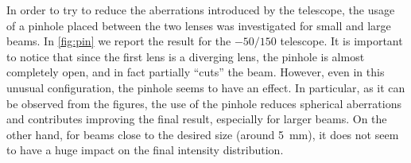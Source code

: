 In order to try to reduce the aberrations introduced by the telescope, the usage of a pinhole placed between the two lenses was investigated for small and large beams. In \cref{fig:pin} we report the result for the $-50/150$ telescope. It is important to notice that since the first lens is a diverging lens, the pinhole is almost completely open, and in fact partially \enquote{cuts} the beam. However, even in this unusual configuration, the pinhole seems to have an effect. In particular, as it can be observed from the figures, the use of the pinhole reduces spherical aberrations and contributes improving the final result, especially for larger beams. On the other hand, for beams close to the desired size (around \SI{5}{mm}), it does not seem to have a huge impact on the final intensity distribution.
